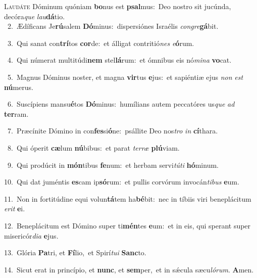 \lettrine{\initial\textcolor{\initialcolor}{L}}{audáte} Dóminum quóniam \textbf{bo}\-nus est \textbf{psal}\-mus:~\star Deo nostro sit jucúnda, decóra\textit{que} \textit{lau}\-\textbf{dá}tio.\\
{\numbfont\textcolor{\numbcolor}{~2.}}~Ædíficans Je\-\textbf{rú}\-salem \textbf{Dó}\-minus:~\star dispersiónes Israélis \textit{con}\-\textit{gre}\textbf{gá}bit.\par
{\numbfont\textcolor{\numbcolor}{~3.}}~Qui sanat con\-\textbf{trí}\-tos \textbf{cor}\-de:~\star et álligat contritió\textit{nes} \textit{e}\-\textbf{ó}rum.\par
{\numbfont\textcolor{\numbcolor}{~4.}}~Qui númerat multitúdi\textbf{nem} stel\-\textbf{lá}\-rum:~\star et ómnibus eis nó\-\textit{mi}\-\textit{na} \textbf{vo}\-cat.\par
{\numbfont\textcolor{\numbcolor}{~5.}}~Magnus Dóminus noster, et magna \textbf{vir}\-tus \textbf{e}\-jus:~\star et sapiéntiæ ejus \textit{non} \textit{est} \textbf{nú}\-merus.\par
{\numbfont\textcolor{\numbcolor}{~6.}}~Suscípiens mansu\-\textbf{é}\-tos \textbf{Dó}\-minus:~\star humílians autem peccatóres us\textit{que} \textit{ad} \textbf{ter}\-ram.\par
{\numbfont\textcolor{\numbcolor}{~7.}}~Præcínite Dómino in con\-\textbf{fes}\-si\-\textbf{ó}\-ne:~\star psállite Deo nos\textit{tro} \textit{in} \textbf{cí}\-thara.\par
{\numbfont\textcolor{\numbcolor}{~8.}}~Qui óperit \textbf{cæ}\-lum \textbf{nú}\-bibus:~\star et parat \textit{ter}\-\textit{ræ} \textbf{plú}\-viam.\par
{\numbfont\textcolor{\numbcolor}{~9.}}~Qui prodúcit in \textbf{món}\-tibus \textbf{fe}\-num:~\star et herbam servi\-\textit{tú}\-\textit{ti} \textbf{hó}\-minum.\par
{\numbfont\textcolor{\numbcolor}{10.}}~Qui dat juméntis \textbf{es}\-cam ip\-\textbf{só}\-rum:~\star et pullis corvórum invocán\-\textit{ti}\-\textit{bus} \textbf{e}\-um.\par
{\numbfont\textcolor{\numbcolor}{11.}}~Non in fortitúdine equi volun\-\textbf{tá}\-tem ha\-\textbf{bé}\-bit:~\star nec in tíbiis viri beneplácitum \textit{e}\-\textit{rit} \textbf{e}\-i.\par
{\numbfont\textcolor{\numbcolor}{12.}}~Beneplácitum est Dómino super ti\-\textbf{mén}\-tes \textbf{e}\-um:~\star et in eis, qui sperant super misericór\-\textit{di}\-\textit{a} \textbf{e}\-jus.\par
{\numbfont\textcolor{\numbcolor}{13.}}~Glória \textbf{Pa}\-tri, et \textbf{Fí}\-lio,~\star et Spirí\-\textit{tu}\-\textit{i} \textbf{Sanc}\-to.\par
{\numbfont\textcolor{\numbcolor}{14.}}~Sicut erat in princípio, et \textbf{nunc}\-, et \textbf{sem}\-per,~\star et in sǽcula sæcu\-\textit{ló}\-\textit{rum}. \textbf{A}\-men.\par
